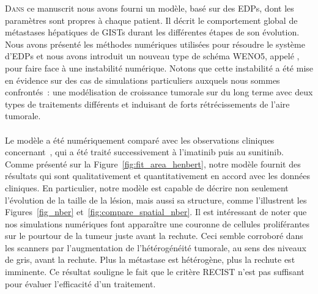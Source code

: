 \documentclass[main.tex]{subfiles}
\begin{document}


\lettrine{D}{ans} ce manuscrit nous avons fourni un modèle, basé sur des EDPs, dont les paramètres sont propres à chaque patient. Il décrit le comportement global de métastases hépatiques de GISTs durant les différentes étapes de son évolution. Nous avons présenté les méthodes numériques utilisées pour résoudre le système d'EDPs et nous avons introduit un nouveau type de schéma WENO5, appelé \twinweno, pour faire face à une instabilité numérique. Notons que cette instabilité a été mise en évidence sur des cas de simulations particuliers auxquels nous sommes confrontés~: une modélisation de croissance tumorale sur du long terme avec deux types de traitements différents et induisant de forts rétrécissements de l'aire tumorale. 


\paragraph{}
Le modèle a été numériquement comparé avec les observations cliniques concernant~\Nber, qui a été traité successivement à l'imatinib puis au sunitinib.
Comme présenté sur la 
Figure~\ref{fig:fit_area_henbert}, notre modèle fournit des résultats qui sont qualitativement et quantitativement en accord avec les données cliniques. En particulier, notre modèle est capable de décrire non seulement l'évolution de la taille de la lésion, mais aussi sa structure, comme l'illustrent les Figures~\ref{fig_nber} et~\ref{fig:compare_spatial_nber}. 
Il est intéressant de noter que nos simulations numériques font apparaître une couronne de cellules proliférantes sur le pourtour de la tumeur juste avant la rechute. Ceci semble corroboré dans les scanners par l'augmentation de l'hétérogénéité tumorale, au sens des niveaux de gris, avant la rechute. Plus la métastase est hétérogène, plus la rechute est imminente. Ce résultat souligne le fait que le critère RECIST n'est pas suffisant pour évaluer l'efficacité d'un traitement.
\end{document}
